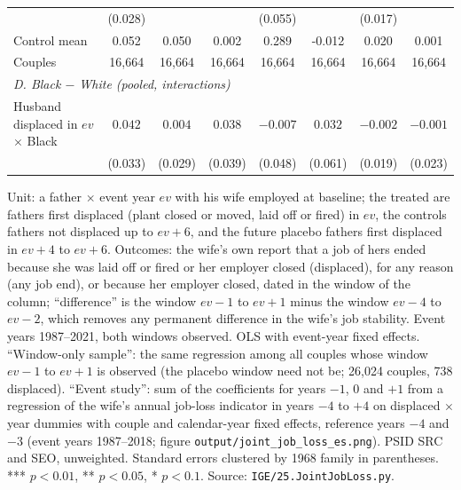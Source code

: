 \begin{table}[htbp]
{\begin{tabular}{lccccccc}
 & (0.028) &  &  & (0.055) &  & (0.017) &  \\
Control mean & 0.052 & 0.050 & 0.002 & 0.289 & -0.012 & 0.020 & 0.001 \\
Couples & 16,664 & 16,664 & 16,664 & 16,664 & 16,664 & 16,664 & 16,664 \\
\multicolumn{8}{l}{\textit{D. Black $-$ White (pooled, interactions)}} \\
Husband displaced in $ev$ $\times$ Black & $0.042$ & $0.004$ & $0.038$ & $-0.007$ & $0.032$ & $-0.002$ & $-0.001$ \\
 & (0.033) & (0.029) & (0.039) & (0.048) & (0.061) & (0.019) & (0.023) \\
\bottomrule
\end{tabular}}
\begin{minipage}{0.95\textwidth}\footnotesize Unit: a father $\times$ event year $ev$ with his wife employed at baseline; the treated are fathers first displaced (plant closed or moved, laid off or fired) in $ev$, the controls fathers not displaced up to $ev+6$, and the future placebo fathers first displaced in $ev+4$ to $ev+6$. Outcomes: the wife's own report that a job of hers ended because she was laid off or fired or her employer closed (displaced), for any reason (any job end), or because her employer closed, dated in the window of the column; ``difference'' is the window $ev-1$ to $ev+1$ minus the window $ev-4$ to $ev-2$, which removes any permanent difference in the wife's job stability. Event years 1987--2021, both windows observed. OLS with event-year fixed effects. ``Window-only sample'': the same regression among all couples whose window $ev-1$ to $ev+1$ is observed (the placebo window need not be; 26,024 couples, 738 displaced). ``Event study'': sum of the coefficients for years $-1$, $0$ and $+1$ from a regression of the wife's annual job-loss indicator in years $-4$ to $+4$ on displaced $\times$ year dummies with couple and calendar-year fixed effects, reference years $-4$ and $-3$ (event years 1987--2018; figure \texttt{output/joint\_job\_loss\_es.png}). PSID SRC and SEO, unweighted. Standard errors clustered by 1968 family in parentheses. *** $p<0.01$, ** $p<0.05$, * $p<0.1$. Source: \texttt{IGE/25.JointJobLoss.py}.\end{minipage}
\end{table}

